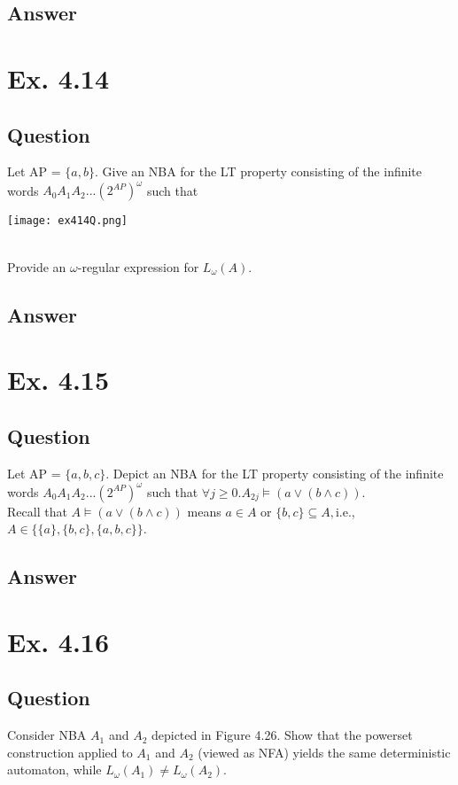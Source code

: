 \documentclass[12pt]{article}
\begin{document}
\subsection*{Answer}

\newpage

\section*{Ex. 4.14}
\subsection*{Question}
Let AP = $\{ a, b \}$. Give an NBA for the LT property consisting of the infinite words $A_0A_1A_2...(2^{AP})^\omega$ such that\\
\begin{centering}
	\texttt{[image: ex414Q.png]}
\end{centering}\\
Provide an $\omega$-regular expression for $L_\omega(A)$.

\subsection*{Answer}


\section*{Ex. 4.15}
\subsection*{Question}
Let AP = $\{a, b, c\}$. Depict an NBA for the LT property consisting of the infinite
words $A_0A_1A_2...(2^{AP})^\omega$ such that $\forall j \geq 0.A_{2j}\models (a\vee (b\wedge c))$.\\
Recall that $A \models (a\vee (b\wedge c))$ means $a \in A$ or $\{b, c\} \subseteq A, $i.e., $A \in \{\{a\}, \{b, c\}, \{a, b, c\}\}$.

\subsection*{Answer}

\newpage
\section*{Ex. 4.16}
\subsection*{Question}
Consider NBA $A_1$ and $A_2$ depicted in Figure 4.26. Show that the powerset
construction applied to $A_1$ and $A_2$ (viewed as NFA) yields the same deterministic automaton,
while $L_\omega(A_1) \neq L_\omega(A_2)$.
\end{document}
